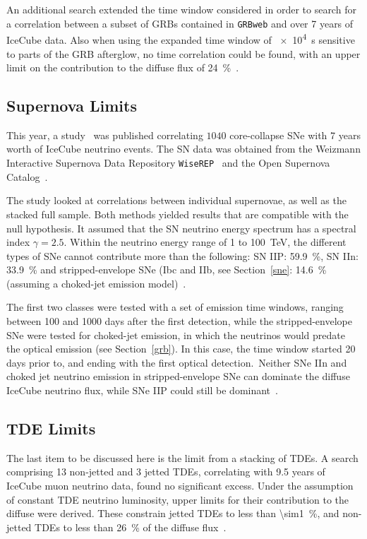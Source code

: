 An additional search extended the time window considered in order to search for a correlation between a subset of GRBs contained in \texttt{GRBweb} and over 7 years of IceCube data. Also when using the expanded time window of \SI{e4}{s} sensitive to parts of the GRB afterglow, no time correlation could be found, with an upper limit on the contribution to the diffuse flux of \SI{24}{\percent}~.

\subsection{Supernova Limits}
This year, a study~ was published correlating $1040$ core-collapse SNe with 7 years worth of IceCube neutrino events. The SN data was obtained from the Weizmann Interactive Supernova Data Repository \texttt{WiseREP}~ and the Open Supernova Catalog~.

The study looked at correlations between individual supernovae, as well as the stacked full sample. Both methods yielded results that are compatible with the null hypothesis. It assumed that the SN neutrino energy spectrum has a spectral index $\gamma=2.5$. Within the neutrino energy range of 1 to \SI{100}{\tera\eV}, the different types of SNe cannot contribute more than the following: SN IIP: \SI{59.9}{\percent}, SN IIn: \SI{33.9}{\percent} and stripped-envelope SNe (Ibc and IIb, see Section~\ref{sne}: \SI{14.6}{\percent} (assuming a choked-jet emission model)~\cite{Necker2023}.

The first two classes were tested with a set of emission time windows, ranging between 100 and 1000 days after the first detection, while the stripped-envelope SNe were tested for choked-jet emission, in which the neutrinos would predate the optical emission (see Section~\ref{grb}). In this case, the time window started 20 days prior to, and ending with the first optical detection.\ Neither SNe IIn and choked jet neutrino emission in stripped-envelope SNe can dominate the diffuse IceCube neutrino flux, while SNe IIP could still be dominant~\cite{Necker2023}.

\subsection{TDE Limits}
The last item to be discussed here is the limit from a stacking of TDEs. A search comprising 13 non-jetted and 3 jetted TDEs, correlating with 9.5 years of IceCube muon neutrino data, found no significant excess. Under the assumption of constant TDE neutrino luminosity, upper limits for their contribution to the diffuse were derived. These constrain jetted TDEs to less than \SI{\sim1}{\percent}, and non-jetted TDEs to less than \SI{26}{\percent} of the diffuse flux~.

